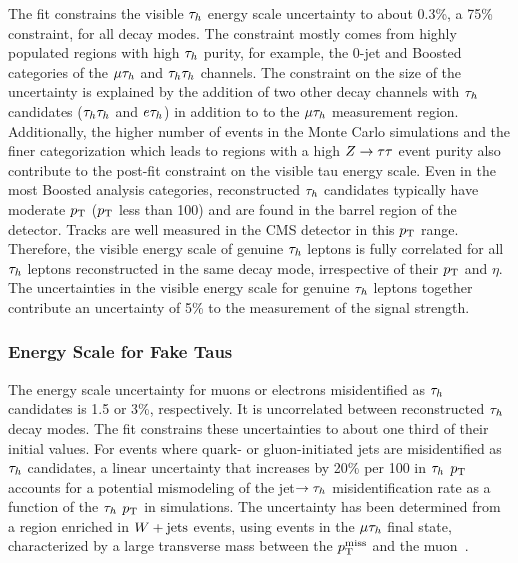 The fit constrains the visible $\tau_{h}$ energy scale uncertainty to about 0.3\%, a 75\% constraint, for all 
decay modes. The constraint mostly comes from highly populated regions with high $\tau_{h}$ purity, for example,
the 0-jet and Boosted categories of the $\mu\tau_{h}$ and $\tau_{h}\tau_{h}$ channels. The constraint on the size of the 
uncertainty is explained by the addition of two other decay channels
with $\tau_{h}$ candidates ($\tau_{h}\tau_{h}$ and $e\tau_{h}$) in addition to to the $\mu\tau_{h}$ measurement region.
Additionally, the higher number of events in the Monte Carlo simulations and the finer categorization which 
leads to regions with a high $Z\to\tau\tau$ event purity also contribute to the post-fit constraint on the
visible tau energy scale.
Even in the most Boosted analysis categories, reconstructed $\tau_{h}$ candidates typically have moderate 
$p_\mathrm{T}$ ($p_\mathrm{T}$ less than 100\GeV) and are
found in the barrel region of the detector. Tracks are well measured in the CMS detector in this $p_\mathrm{T}$ range.
Therefore, the visible energy scale of genuine $\tau_{h}$ leptons is fully correlated for all $\tau_{h}$ leptons 
reconstructed in the same decay mode, irrespective of their $p_\mathrm{T}$ and $\eta$. The uncertainties in the 
visible energy scale for genuine $\tau_{h}$ leptons together contribute an uncertainty of 5\% to the measurement 
of the signal strength.


\subsubsection{Energy Scale for Fake Taus}
The energy scale uncertainty for muons or electrons
misidentified as $\tau_{h}$ candidates is 1.5 or 3\%, respectively. It is uncorrelated between reconstructed $\tau_{h}$ decay
modes. The fit constrains these uncertainties to about one third of their initial values. For events where quark- or 
gluon-initiated jets are misidentified as $\tau_{h}$ candidates, a linear uncertainty that increases by 20\% per 100\GeV 
in $\tau_{h}$ $p_\mathrm{T}$ accounts for a potential mismodeling of the jet$\to\tau_{h}$ misidentification rate as a
function of the $\tau_{h}$ $p_\mathrm{T}$ in simulations. The uncertainty has been determined from a region enriched in $W+\text{jets}$ 
events, using events in the $\mu\tau_{h}$ final state, characterized by a large transverse mass 
between the $p_\mathrm{T}^\text{miss}$ and the muon~\cite{Khachatryan:2015dfa,CMS-PAS-TAU-16-002}.

